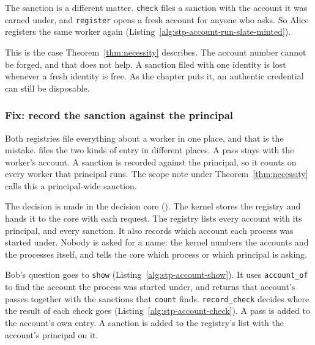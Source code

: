 The sanction is a different matter. \texttt{check} files a sanction with
the account it was earned under, and \texttt{register} opens a fresh
account for anyone who asks. So Alice registers the same worker again
(Listing~\ref{alg:stp-account-run-slate-minted}).


This is the case Theorem~\ref{thm:necessity} describes. The account
number cannot be forged, and that does not help. A sanction filed with
one identity is lost whenever a fresh identity is free. As the chapter
puts it, an authentic credential can still be disposable.

\subsubsection{Fix: record the sanction against the principal}

Both registries file everything about a worker in one place, and that is
the mistake. \pdkernelname{} files the two kinds of entry in different
places. A pass stays with the worker's account. A sanction is recorded
against the principal, so it counts on every worker that principal runs.
The scope note under Theorem~\ref{thm:necessity} calls this a
principal-wide sanction.

The decision is made in the decision core
(). The kernel stores the
registry and hands it to the core with each request. The registry lists
every account with its principal, and every sanction. It also records
which account each process was started under. Nobody is asked for a
name: the kernel numbers the accounts and the processes itself, and
tells the core which process or which principal is asking.

Bob's question goes to \texttt{show}
(Listing~\ref{alg:stp-account-show}). It uses \texttt{account\_of} to
find the account the process was started under, and returns that
account's passes together with the sanctions that \texttt{count} finds.
\texttt{record\_check} decides where the result of each check goes
(Listing~\ref{alg:stp-account-check}). A pass is added to the account's
own entry. A sanction is added to the registry's list with the account's
principal on it.

